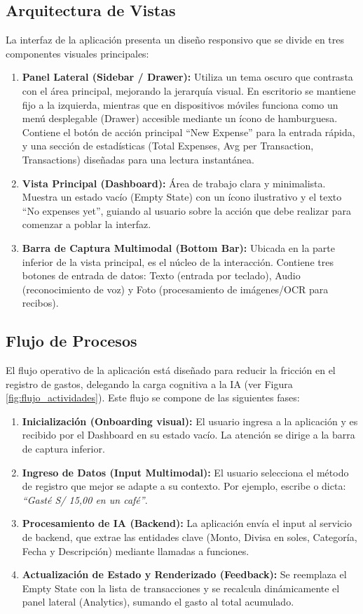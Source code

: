 \documentclass[12pt]{article}
\begin{document}
\subsection{Arquitectura de Vistas}
La interfaz de la aplicación presenta un diseño responsivo que se divide en tres componentes visuales principales:
\begin{enumerate}
    \item \textbf{Panel Lateral (Sidebar / Drawer):} Utiliza un tema oscuro que contrasta con el área principal, mejorando la jerarquía visual. En escritorio se mantiene fijo a la izquierda, mientras que en dispositivos móviles funciona como un menú desplegable (Drawer) accesible mediante un ícono de hamburguesa. Contiene el botón de acción principal ``New Expense'' para la entrada rápida, y una sección de estadísticas (Total Expenses, Avg per Transaction, Transactions) diseñadas para una lectura instantánea.
    \item \textbf{Vista Principal (Dashboard):} Área de trabajo clara y minimalista. Muestra un estado vacío (Empty State) con un ícono ilustrativo y el texto ``No expenses yet'', guiando al usuario sobre la acción que debe realizar para comenzar a poblar la interfaz.
    \item \textbf{Barra de Captura Multimodal (Bottom Bar):} Ubicada en la parte inferior de la vista principal, es el núcleo de la interacción. Contiene tres botones de entrada de datos: Texto (entrada por teclado), Audio (reconocimiento de voz) y Foto (procesamiento de imágenes/OCR para recibos).
\end{enumerate}

\subsection{Flujo de Procesos}
El flujo operativo de la aplicación está diseñado para reducir la fricción en el registro de gastos, delegando la carga cognitiva a la IA (ver Figura \ref{fig:flujo_actividades}). Este flujo se compone de las siguientes fases:
\begin{enumerate}
    \item \textbf{Inicialización (Onboarding visual):} El usuario ingresa a la aplicación y es recibido por el Dashboard en su estado vacío. La atención se dirige a la barra de captura inferior.
    \item \textbf{Ingreso de Datos (Input Multimodal):} El usuario selecciona el método de registro que mejor se adapte a su contexto. Por ejemplo, escribe o dicta: \textit{``Gasté S/ 15,00 en un café''}.
    \item \textbf{Procesamiento de IA (Backend):} La aplicación envía el input al servicio de backend, que extrae las entidades clave (Monto, Divisa en soles, Categoría, Fecha y Descripción) mediante llamadas a funciones.
    \item \textbf{Actualización de Estado y Renderizado (Feedback):} Se reemplaza el Empty State con la lista de transacciones y se recalcula dinámicamente el panel lateral (Analytics), sumando el gasto al total acumulado.
\end{enumerate}
\end{document}
